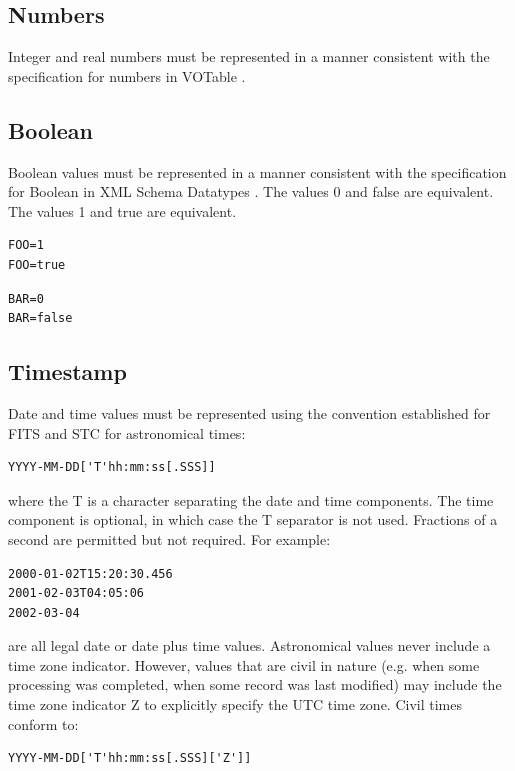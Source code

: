 \documentclass[11pt,letter]{ivoa}
\begin{document}
\subsection{Numbers}
Integer and real numbers must be represented in a manner consistent with the
specification for numbers in VOTable \citep{2019ivoa.spec.1021O}.

\subsection{Boolean}
Boolean values must be represented in a manner consistent with the
specification
for Boolean in XML Schema Datatypes \citep{std:XSD2}. The values 0 and false
are equivalent. The values 1 and true are equivalent.

\begin{verbatim}
FOO=1
FOO=true
\end{verbatim}

\begin{verbatim}
BAR=0
BAR=false
\end{verbatim}

\subsection{Timestamp}
Date and time values must be represented  using the convention established for
FITS \citep{std:FITS} and STC \citep{2007ivoa.spec.1030R} for astronomical times:

\begin{verbatim}
YYYY-MM-DD['T'hh:mm:ss[.SSS]]
\end{verbatim}

where the  T is a character separating the date and time components. The time
component is optional, in which case the T separator is not used. Fractions of a
second are permitted but not required. For example:

\begin{verbatim}
2000-01-02T15:20:30.456
2001-02-03T04:05:06
2002-03-04
\end{verbatim}

are all legal date or date plus time values. Astronomical values never
include a time zone indicator. However, values that
are civil in nature (e.g. when some processing was completed, when some record
was last modified) may include the time zone indicator Z to explicitly specify
the UTC time zone. Civil times conform to:

\begin{verbatim}
YYYY-MM-DD['T'hh:mm:ss[.SSS]['Z']]
\end{verbatim}
\end{document}
